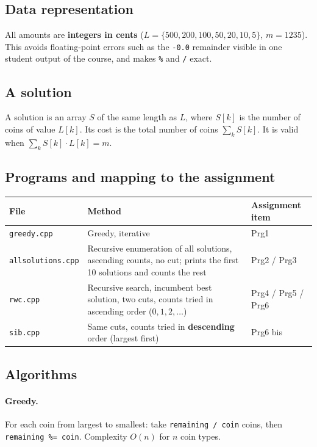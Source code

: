 \documentclass[11pt,a4paper]{article}
\begin{document}
\subsection{Data representation}
All amounts are \textbf{integers in cents} ($L=\{500,200,100,50,20,10,5\}$, $m=1235$). This avoids floating-point errors such as the \texttt{-0.0} remainder visible in one student output of the course, and makes \texttt{\%} and \texttt{/} exact.

\subsection{A solution}
A solution is an array $S$ of the same length as $L$, where $S[k]$ is the number of coins of value $L[k]$. Its cost is the total number of coins $\sum_k S[k]$. It is valid when $\sum_k S[k]\cdot L[k]=m$.

\subsection{Programs and mapping to the assignment}
\begin{center}
\begin{tabularx}{\textwidth}{@{}lXl@{}}
\toprule
File & Method & Assignment item \\
\midrule
\texttt{greedy.cpp} & Greedy, iterative & Prg1 \\
\texttt{allsolutions.cpp} & Recursive enumeration of all solutions, ascending counts, no cut; prints the first 10 solutions and counts the rest & Prg2 / Prg3 \\
\texttt{rwc.cpp} & Recursive search, incumbent best solution, two cuts, counts tried in ascending order ($0,1,2,\dots$) & Prg4 / Prg5 / Prg6 \\
\texttt{sib.cpp} & Same cuts, counts tried in \textbf{descending} order (largest first) & Prg6 bis \\
\bottomrule
\end{tabularx}
\end{center}

\subsection{Algorithms}
\paragraph{Greedy.} For each coin from largest to smallest: take \texttt{remaining / coin} coins, then \texttt{remaining \%= coin}. Complexity $O(n)$ for $n$ coin types.
\end{document}
